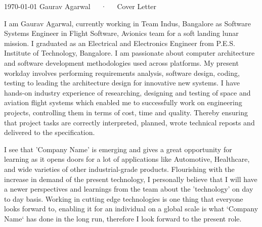 \documentclass[11pt, a4paper]{awesome-cv}
\begin{document}
\makecvheader[R]

\makecvfooter
  {\today}
  {Gaurav Agarwal~~~·~~~Cover Letter}
  {}

\makelettertitle

\begin{cvletter}


I am Gaurav Agarwal, currently working in Team Indus, Bangalore as Software Systems Engineer in Flight Software, Avionics team for a soft landing lunar mission. I graduated as an Electrical and Electronics Engineer from P.E.S. Institute of Technology, Bangalore. I am passionate about computer architecture and software development methodologies used across platforms. My present workday involves performing requirements analysis, software design, coding, testing to leading the architecture design for innovative new systems. I have hands-on industry experience of researching, designing and testing of space and aviation flight systems which enabled me to successfully work on engineering projects, controlling them in terms of cost, time and quality. Thereby ensuring that project tasks are correctly interpreted, planned, wrote technical reposts and delivered to the specification.


I see that 'Company Name' is emerging and gives a great opportunity for learning as it opens doors for a lot of applications like Automotive, Healthcare, and wide varieties of other industrial-grade products. Flourishing with the increase in demand of the present technology, I personally believe that I will have a newer perspectives and learnings from the team about the 'technology' on day to day basis. Working in cutting edge technologies is one thing that everyone looks forward to, enabling it for an individual on a global scale is what ‘Company Name‘ has done in the long run, therefore I look forward to the present role.



\end{cvletter}
\end{document}
